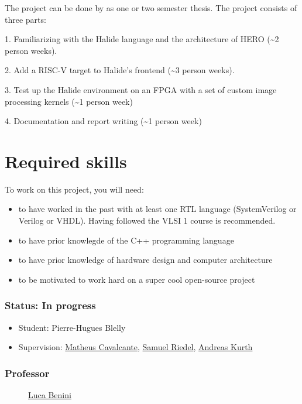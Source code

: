 The project can be done by as one or two semester thesis. The project
consists of three parts:

1. Familiarizing with the Halide language and the architecture of HERO
(\textasciitilde2 person weeks).

2. Add a RISC-V target to Halide's frontend (\textasciitilde3 person
weeks).

3. Test up the Halide environment on an FPGA with a set of custom image
processing kernels (\textasciitilde1 person week)

4. Documentation and report writing (\textasciitilde1 person week)

\section{Required skills}

To work on this project, you will need:

\begin{itemize}
\item
  to have worked in the past with at least one RTL language
  (SystemVerilog or Verilog or VHDL). Having followed the VLSI 1 course
  is recommended.
\item
  to have prior knowlegde of the C++ programming language
\item
  to have prior knowledge of hardware design and computer architecture
\item
  to be motivated to work hard on a super cool open-source project
\end{itemize}

\subsubsection{Status: In progress}

\begin{itemize}
\item
  Student: Pierre-Hugues Blelly
\item
  Supervision: \href{:User:Matheusd}{Matheus Cavalcante},
  \href{:User:Sriedel}{Samuel Riedel}, \href{:User:Akurth}{ Andreas
  Kurth}
\end{itemize}

\hypertarget{professor}{%
\subsubsection{Professor}\label{professor}}

\begin{description}
\item[]
\href{http://www.iis.ee.ethz.ch/portrait/staff/lbenini.en.html}{Luca
Benini}
\end{description}

